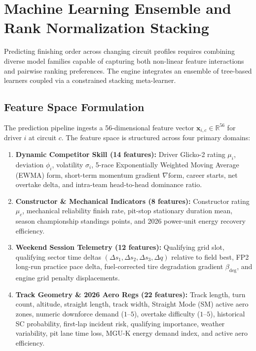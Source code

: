 \section{Machine Learning Ensemble and Rank Normalization Stacking}
\label{sec:ml_ensemble_stacking}

Predicting finishing order across changing circuit profiles requires combining diverse model families capable of capturing both non-linear feature interactions and pairwise ranking preferences. The engine integrates an ensemble of tree-based learners coupled via a constrained stacking meta-learner.

\subsection{Feature Space Formulation}
The prediction pipeline ingests a 56-dimensional feature vector $\mathbf{x}_{i, c} \in \mathbb{R}^{56}$ for driver $i$ at circuit $c$. The feature space is structured across four primary domains:
\begin{enumerate}
    \item \textbf{Dynamic Competitor Skill (14 features):} Driver Glicko-2 rating $\mu_i$, deviation $\phi_i$, volatility $\sigma_i$, 5-race Exponentially Weighted Moving Average (EWMA) form, short-term momentum gradient $\nabla \text{form}$, career starts, net overtake delta, and intra-team head-to-head dominance ratio.
    \item \textbf{Constructor \& Mechanical Indicators (8 features):} Constructor rating $\mu_c$, mechanical reliability finish rate, pit-stop stationary duration mean, season championship standings points, and 2026 power-unit energy recovery efficiency.
    \item \textbf{Weekend Session Telemetry (12 features):} Qualifying grid slot, qualifying sector time deltas $(\Delta s_{1}, \Delta s_{2}, \Delta s_{3}, \Delta q)$ relative to field best, FP2 long-run practice pace delta, fuel-corrected tire degradation gradient $\beta_{\text{deg}}$, and engine grid penalty displacements.
    \item \textbf{Track Geometry \& 2026 Aero Regs (22 features):} Track length, turn count, altitude, straight length, track width, Straight Mode (SM) active aero zones, numeric downforce demand ($1$--$5$), overtake difficulty ($1$--$5$), historical SC probability, first-lap incident risk, qualifying importance, weather variability, pit lane time loss, MGU-K energy demand index, and active aero efficiency.
\end{enumerate}

